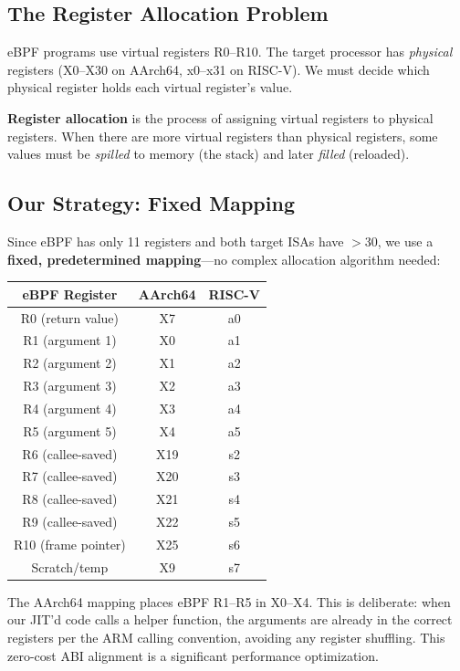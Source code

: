 \documentclass[11pt,letterpaper]{article}
\begin{document}
\subsection{The Register Allocation Problem}

eBPF programs use virtual registers R0--R10. The target processor has \emph{physical} registers (X0--X30 on AArch64, x0--x31 on RISC-V). We must decide which physical register holds each virtual register's value.

\begin{definition}
\textbf{Register allocation} is the process of assigning virtual registers to physical registers. When there are more virtual registers than physical registers, some values must be \emph{spilled} to memory (the stack) and later \emph{filled} (reloaded).
\end{definition}

\subsection{Our Strategy: Fixed Mapping}

Since eBPF has only 11 registers and both target ISAs have $>$30, we use a \textbf{fixed, predetermined mapping}---no complex allocation algorithm needed:

\begin{center}
\begin{tabular}{ccc}
\toprule
\textbf{eBPF Register} & \textbf{AArch64} & \textbf{RISC-V} \\
\midrule
R0 (return value) & X7 & a0 \\
R1 (argument 1) & X0 & a1 \\
R2 (argument 2) & X1 & a2 \\
R3 (argument 3) & X2 & a3 \\
R4 (argument 4) & X3 & a4 \\
R5 (argument 5) & X4 & a5 \\
R6 (callee-saved) & X19 & s2 \\
R7 (callee-saved) & X20 & s3 \\
R8 (callee-saved) & X21 & s4 \\
R9 (callee-saved) & X22 & s5 \\
R10 (frame pointer) & X25 & s6 \\
\midrule
Scratch/temp & X9 & s7 \\
\bottomrule
\end{tabular}
\end{center}

\begin{keyinsight}
The AArch64 mapping places eBPF R1--R5 in X0--X4. This is deliberate: when our JIT'd code calls a helper function, the arguments are already in the correct registers per the ARM calling convention, avoiding any register shuffling. This zero-cost ABI alignment is a significant performance optimization.
\end{keyinsight}
\end{document}
